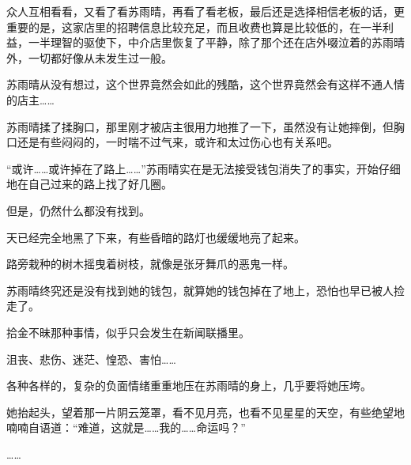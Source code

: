 众人互相看看，又看了看苏雨晴，再看了看老板，最后还是选择相信老板的话，更重要的是，这家店里的招聘信息比较充足，而且收费也算是比较低的，在一半利益，一半理智的驱使下，中介店里恢复了平静，除了那个还在店外啜泣着的苏雨晴外，一切都好像从未发生过一般。

苏雨晴从没有想过，这个世界竟然会如此的残酷，这个世界竟然会有这样不通人情的店主……

苏雨晴揉了揉胸口，那里刚才被店主很用力地推了一下，虽然没有让她摔倒，但胸口还是有些闷闷的，一时喘不过气来，或许和太过伤心也有关系吧。

“或许……或许掉在了路上……”苏雨晴实在是无法接受钱包消失了的事实，开始仔细地在自己过来的路上找了好几圈。

但是，仍然什么都没有找到。

天已经完全地黑了下来，有些昏暗的路灯也缓缓地亮了起来。

路旁栽种的树木摇曳着树枝，就像是张牙舞爪的恶鬼一样。

苏雨晴终究还是没有找到她的钱包，就算她的钱包掉在了地上，恐怕也早已被人捡走了。

拾金不昧那种事情，似乎只会发生在新闻联播里。

沮丧、悲伤、迷茫、惶恐、害怕……

各种各样的，复杂的负面情绪重重地压在苏雨晴的身上，几乎要将她压垮。

她抬起头，望着那一片阴云笼罩，看不见月亮，也看不见星星的天空，有些绝望地喃喃自语道：“难道，这就是……我的……命运吗？”

……
